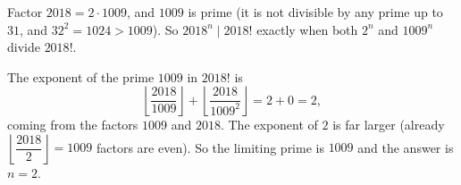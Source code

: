 Factor $2018=2\cdot1009$, and $1009$ is prime (it is not divisible by any prime up to $31$, and $32^2=1024>1009$). So $2018^n\mid2018!$ exactly when both $2^n$ and $1009^n$ divide $2018!$.

The exponent of the prime $1009$ in $2018!$ is
\[
\left\lfloor\dfrac{2018}{1009}\right\rfloor+\left\lfloor\dfrac{2018}{1009^2}\right\rfloor=2+0=2,
\]
coming from the factors $1009$ and $2018$. The exponent of $2$ is far larger (already $\left\lfloor\dfrac{2018}{2}\right\rfloor=1009$ factors are even). So the limiting prime is $1009$ and the answer is $n=\boxed{2}$.
